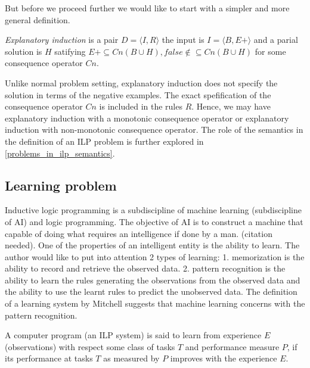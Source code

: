 But before we proceed further we would like to start with a simpler and more general definition.
\begin{defn}
\emph{Explanatory induction} is a pair $D=\langle I, R \rangle$
the input is $I=\langle B, E+ \rangle$ and a parial solution is $H$ satifying
$E+ \subseteq Cn(B \cup H), false \not\in \subseteq Cn(B \cup H)$ for some consequence operator $Cn$.
\end{defn}
Unlike normal problem setting, explanatory induction does not specify the solution in terms of the negative examples. The exact spefification of the consequence operator $Cn$ is included in the rules $R$. Hence, we may have explanatory induction with a monotonic consequence operator or explanatory induction with non-monotonic consequence operator. The role of the semantics in the definition of an ILP problem is further explored in \ref{problems_in_ilp_semantics}.

\subsection{Learning problem}
Inductive logic programming is a subdiscipline of machine learning (subdiscipline of AI) and logic programming. The objective of AI is to construct a machine that capable of doing what requires an intelligence if done by a man. (citation needed). One of the properties of an intelligent entity is the ability to learn. The author would like to put into attention 2 types of learning:
1. memorization is the ability to record and retrieve the observed data.
2. pattern recognition is the ability to learn the rules generating the observations from the observed data and the ability to use the learnt rules to predict the unobserved data. The definition of a learning system by Mitchell suggests that machine learning concerns with the pattern recognition.

\begin{defn}\cite{mitchell1997machine}
A computer program (an ILP system) is said to learn from experience $E$ (observations)
with respect some class of tasks $T$ and performance measure $P$,
if its performance at tasks $T$ as measured by $P$ improves with the experience $E$.
\end{defn}

